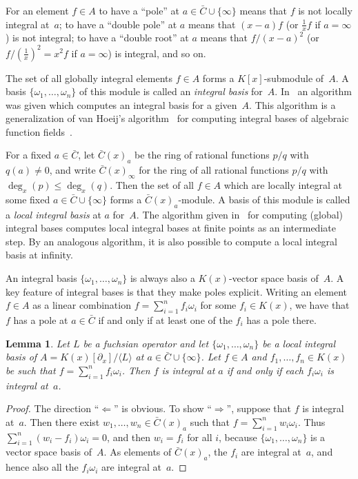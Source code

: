 \documentclass{sig-alternate}
\newtheorem{lemma}[theorem]{Lemma}
\def\<#1>{\langle#1\rangle}
\begin{document}
For an element $f\in A$ to have a ``pole'' at $a\in\bar C\cup\{\infty\}$ means
that $f$ is not locally integral at~$a$; to have a ``double pole'' at $a$ means
that $(x-a)f$ (or $\frac1xf$ if $a=\infty$) is not integral; to have a ``double
root'' at $a$ means that $f/(x-a)^2$ (or $f/(\frac1x)^2=x^2f$ if $a=\infty$) is integral,
and so on.

The set of all globally integral elements $f\in A$ forms a $K[x]$-submodule of~$A$.
A basis $\{\omega_1,\dots,\omega_n\}$ of this module is called an \emph{integral basis}
for~$A$. In~\cite{kauers15b} an algorithm was given which computes an integral basis
for a given~$A$. This algorithm is a generalization of van Hoeij's
algorithm~\cite{vanHoeij94} for computing integral bases of algebraic function
fields~\cite{trager84,Rybowicz:1991:ACI:120694.120715}.

For a fixed $a\in\bar C$, let $\bar C(x)_a$ be the ring of rational functions $p/q$
with $q(a)\neq0$, and write $\bar C(x)_\infty$ for the ring of all
rational functions $p/q$ with $\deg_x(p)\leq\deg_x(q)$.
Then the set of all $f\in A$ which are locally integral at some
fixed $a\in\bar C\cup\{\infty\}$ forms a $\bar C(x)_a$-module. A basis of this module is
called a \emph{local integral basis} at $a$ for~$A$. The algorithm given in~\cite{kauers15b}
for computing (global) integral bases computes local integral bases at finite
points as an intermediate step. By an analogous algorithm, it is also possible
to compute a local integral basis at infinity.

An integral basis $\{\omega_1,\dots,\omega_n\}$ is always also a $K(x)$-vector space
basis of~$A$. A key feature of integral bases is that they make poles explicit. Writing
an element $f\in A$ as a linear combination $f=\sum_{i=1}^n f_i\omega_i$ for some
$f_i\in K(x)$, we have that $f$ has a pole at $a\in\bar C$ if and only if at least one
of the $f_i$ has a pole there.

\begin{lemma}\label{lemma:1}
  Let $L$ be a fuchsian operator and let
  $\{\omega_1,\dots,\omega_n\}$ be a local integral basis of $A=K(x)[\partial_x]/\<L>$ at $a\in\bar C\cup\{\infty\}$.
  Let $f\in A$ and $f_1,\dots,f_n\in K(x)$ be such that $f=\sum_{i=1}^nf_i\omega_i$.
  Then $f$ is integral at $a$ if and only if each $f_i\omega_i$ is integral at~$a$.
\end{lemma}
\begin{proof}
  The direction ``$\Leftarrow$'' is obvious. To show ``$\Rightarrow$'', suppose
  that $f$ is integral at~$a$. Then there exist $w_1,\dots,w_n\in\bar C(x)_a$ such that
  $f=\sum_{i=1}^nw_i\omega_i$. Thus $\sum_{i=1}^n(w_i-f_i)\omega_i=0$, and then
  $w_i=f_i$ for all $i$, because $\{\omega_1,\dots,\omega_n\}$ is a vector space basis of~$A$.
  As elements of $\bar C(x)_a$, the $f_i$ are integral at~$a$, and hence also all the $f_i\omega_i$
  are integral at~$a$.
\end{proof}
\end{document}
